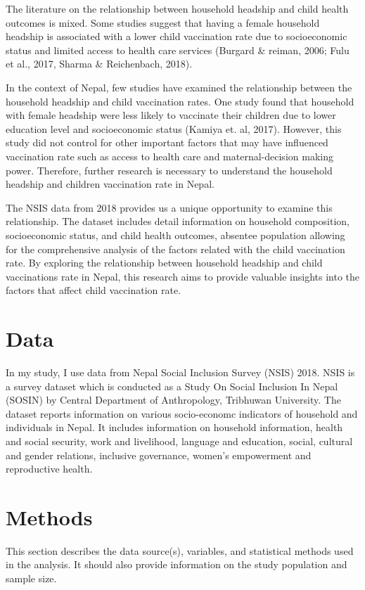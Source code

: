 \documentclass[12pt]{article}
\begin{document}
The literature on the relationship between household headship and child health outcomes is mixed. Some studies suggest that having a female household headship is associated with a lower child vaccination rate due to socioeconomic status and limited access to health care services (Burgard \& reiman, 2006; Fulu et al., 2017, Sharma \& Reichenbach, 2018). 

In the context of Nepal, few studies have examined the relationship between the household headship and child vaccination rates. One study found that household with female headship were less likely to vaccinate their children due to lower education level and socioeconomic status (Kamiya et. al, 2017). However, this study did not control for other important factors that may have influenced vaccination rate such as access to health care and maternal-decision making power. Therefore, further research is necessary to understand the household headship and children vaccination rate in Nepal.

The NSIS data from 2018 provides us a unique opportunity to examine this relationship. The dataset includes detail information on household composition, socioeconomic status, and child health outcomes, absentee population allowing for the comprehensive analysis of the factors related with the child vaccination rate. By exploring the relationship between household headship and child vaccinations rate in Nepal, this research aims to provide valuable insights into the factors that affect child vaccination rate.


\section{Data}
In my study, I use data from Nepal Social Inclusion Survey (NSIS) 2018. NSIS is a survey dataset which is conducted as a Study On Social Inclusion In Nepal (SOSIN) by Central Department of Anthropology, Tribhuwan University.  The dataset reports information on various socio-economc indicators of household and individuals in Nepal. It includes information on household information, health and social security, work and livelihood, language and education, social, cultural and gender relations, inclusive governance, women's empowerment and reproductive health.


\section{Methods}
This section describes the data source(s), variables, and statistical methods used in the analysis. It should also provide information on the study population and sample size.
\end{document}
